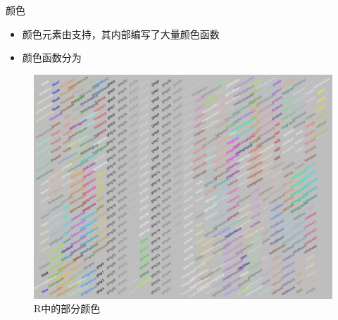 \documentclass{beamerthemeMono}
\begin{document}
\begin{frame}[t]{\subsecname}{颜色}
\begin{itemize}
\item<1-> 颜色元素由支持，其内部编写了大量颜色函数
\item<2-> 颜色函数分为
\end{itemize}

\begin{figure}
  \centering
  \includegraphics[width=0.7\columnwidth]{colors-example.png}
  \caption{R中的部分颜色} 
\end{figure}  
\end{frame}
\end{document}
